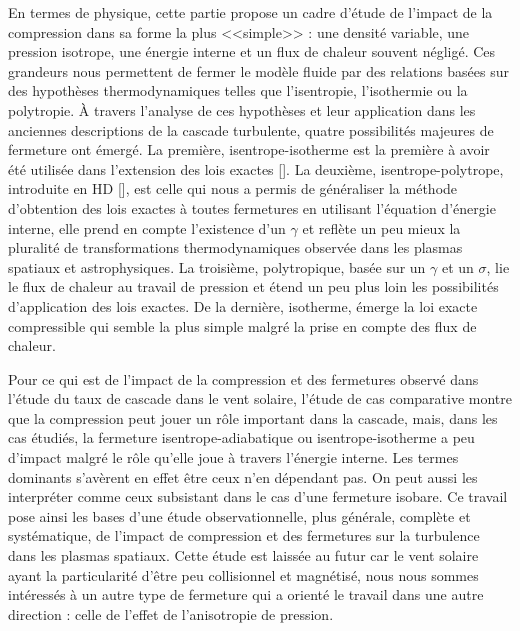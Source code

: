 En termes de physique, cette partie propose un cadre d'étude de l'impact de la compression dans sa forme la plus <<simple>> : une densité variable, une pression isotrope, une énergie interne et un flux de chaleur souvent négligé. Ces grandeurs nous permettent de fermer le modèle fluide par des relations basées sur des hypothèses thermodynamiques telles que l'isentropie, l'isothermie ou la polytropie. À travers l'analyse de ces hypothèses et leur application dans les anciennes descriptions de la cascade turbulente, quatre possibilités majeures de fermeture ont émergé. La première, isentrope-isotherme est la première à avoir été utilisée dans l'extension des lois exactes [\cite{galtier_exact_2011,banerjee_exact_2013,andres_alternative_2017}]. La deuxième, isentrope-polytrope, introduite en HD [\cite{banerjee_kolmogorov-like_2014}], est celle qui nous a permis de généraliser la méthode d'obtention des lois exactes à toutes fermetures en utilisant l'équation d'énergie interne, elle prend en compte l'existence d'un $\gamma$ et reflète un peu mieux la pluralité de transformations thermodynamiques observée dans les plasmas spatiaux et astrophysiques. La troisième, polytropique, basée sur un $\gamma$ et un $\sigma$, lie le flux de chaleur au travail de pression et étend un peu plus loin les possibilités d'application des lois exactes. De la dernière, isotherme, émerge la loi exacte compressible qui semble la plus simple malgré la prise en compte des flux de chaleur. 

Pour ce qui est de l'impact de la compression et des fermetures observé dans l'étude du taux de cascade dans le vent solaire, l'étude de cas comparative montre que la compression peut jouer un rôle important dans la cascade, mais, dans les cas étudiés, la fermeture isentrope-adiabatique ou isentrope-isotherme a peu d'impact malgré le rôle qu'elle joue à travers l'énergie interne. Les termes dominants s'avèrent en effet être ceux n'en dépendant pas. On peut aussi les interpréter comme ceux subsistant dans le cas d'une fermeture isobare. Ce travail pose ainsi les bases d'une étude observationnelle, plus générale, complète et systématique, de l'impact de compression et des fermetures sur la turbulence dans les plasmas spatiaux. Cette étude est laissée au futur car le vent solaire ayant la particularité d'être peu collisionnel et magnétisé, nous nous sommes intéressés à un autre type de fermeture qui a orienté le travail dans une autre direction : celle de l'effet de l'anisotropie de pression.  










